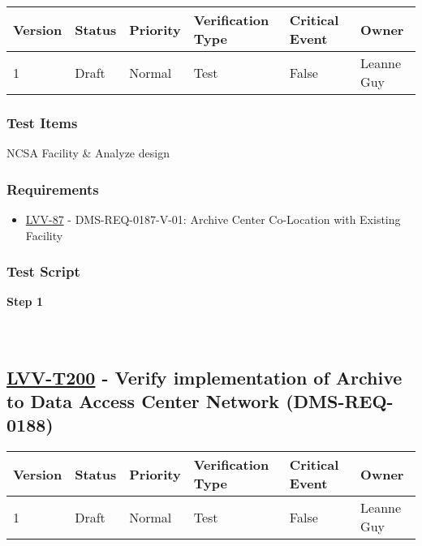 \begin{longtable}[]{@{}llllll@{}}
\toprule
Version & Status & Priority & Verification Type & Critical Event &
Owner\tabularnewline
\midrule
\endhead
1 & Draft & Normal & Test & False & Leanne Guy\tabularnewline
\bottomrule
\end{longtable}

\hypertarget{test-items-99}{%
\subsubsection{Test Items}\label{test-items-99}}

NCSA Facility \& Analyze design

\hypertarget{requirements-99}{%
\subsubsection{Requirements}\label{requirements-99}}

\begin{itemize}
\tightlist
\item
  \href{https://jira.lsstcorp.org/browse/LVV-87}{LVV-87} -
  DMS-REQ-0187-V-01: Archive Center Co-Location with Existing Facility
\end{itemize}

\hypertarget{test-script-99}{%
\subsubsection{Test Script}\label{test-script-99}}

\textbf{Step 1}\\
~\\
~\\

\hypertarget{lvv-t200---verify-implementation-of-archive-to-data-access-center-network-dms-req-0188}{%
\subsection{\texorpdfstring{\href{https://jira.lsstcorp.org/secure/Tests.jspa\#/testCase/LVV-T200}{LVV-T200}
- Verify implementation of Archive to Data Access Center Network
(DMS-REQ-0188)}{LVV-T200 - Verify implementation of Archive to Data Access Center Network (DMS-REQ-0188)}}\label{lvv-t200---verify-implementation-of-archive-to-data-access-center-network-dms-req-0188}}

\begin{longtable}[]{@{}llllll@{}}
\toprule
Version & Status & Priority & Verification Type & Critical Event &
Owner\tabularnewline
\midrule
\endhead
1 & Draft & Normal & Test & False & Leanne Guy\tabularnewline
\bottomrule
\end{longtable}

